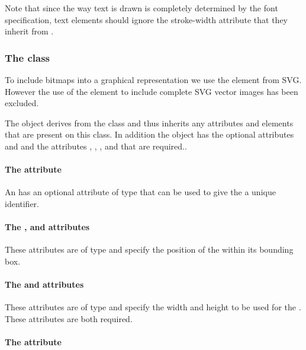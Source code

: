 Note that since the way text is drawn is completely determined by the font 
specification, text elements should ignore the stroke-width attribute that they 
inherit from \GraphicalPrimitiveOneD.

\subsubsection{The  class}
\label{image-class}

To include bitmaps into a graphical representation we use the \Image element 
from SVG. However the use of the \Image element to include complete SVG 
vector images has been excluded.


The \Image object derives from the \TransformationTwoD class and thus
inherits any attributes and elements that are present on this class.
In addition the \Image object has the optional attributes  and  and the attributes , , ,  and  that are required..

\paragraph{The \fixttspace{} attribute}

An \Image has an optional attribute  of type  that can be used to give the \Image a unique identifier.

\paragraph{The \fixttspace{}, \fixttspace{} and \fixttspace{}  attributes}

These attributes are of type
\RelAbsVector and specify the position of the \Image within its bounding box.

\paragraph{The \fixttspace{} and  attributes}

These attributes are of type
\RelAbsVector and specify the width and height to be used for the \Image. These attributes are both required.

\paragraph{The \fixttspace{} attribute}

